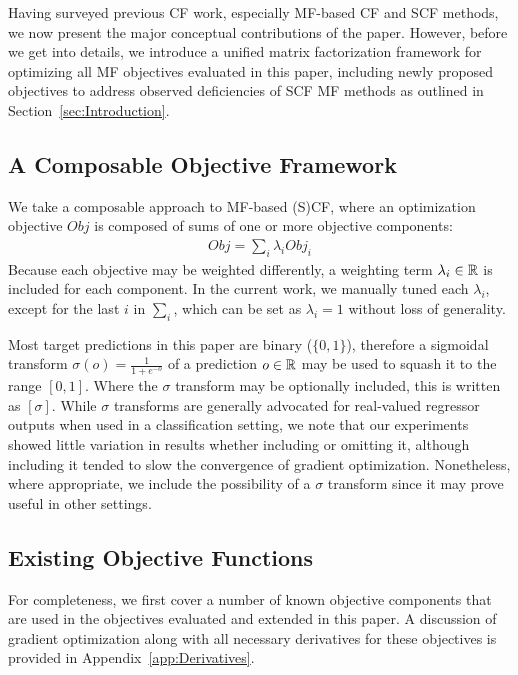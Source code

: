 Having surveyed previous CF work, especially MF-based CF and SCF
methods, we now present the major conceptual contributions of the
paper.  However, before we get into details, we introduce a unified
matrix factorization framework for optimizing all MF objectives
evaluated in this paper, including newly proposed objectives to
address observed deficiencies of SCF MF methods as outlined in
Section~\ref{sec:Introduction}.

\subsection{A Composable Objective Framework}


We take a composable approach to MF-based (S)CF, where an optimization
objective $\mathit{Obj}$ is composed of sums of one or more objective
components:
\begin{align}
\mathit{Obj} = \sum_i \lambda_i \mathit{Obj}_i
\end{align}
Because each objective may be weighted differently, a weighting term
$\lambda_i \in \mathbb{R}$ is included for each component.  In the current work,
we manually tuned each $\lambda_i$, except for the last $i$ in $\sum_i$,
which can be set as $\lambda_i = 1$ without loss of generality.

Most target predictions in this paper are binary ($\{0,1\}$),
therefore a sigmoidal transform $\sigma(o) = \frac{1}{1 + e^{-o}}$ of
a prediction $o \in \mathbb{R}$ may be used to squash it to the range $[0,
1]$.  Where the $\sigma$ transform may be optionally
included, this is written as $[\sigma]$.  While $\sigma$ transforms
are generally advocated for real-valued regressor outputs when used in
a classification setting, we note that our experiments showed little
variation in results whether including or omitting it, although
including it tended to slow the convergence of gradient optimization.
Nonetheless, where appropriate, we include the possibility of a
$\sigma$ transform since it may prove useful in other settings.

\subsection{Existing Objective Functions}

For completeness, we first cover a number of known objective
components that are used in the objectives evaluated and
extended in this paper.  A discussion of gradient optimization along
with all necessary derivatives for these objectives is provided in
Appendix~\ref{app:Derivatives}.

